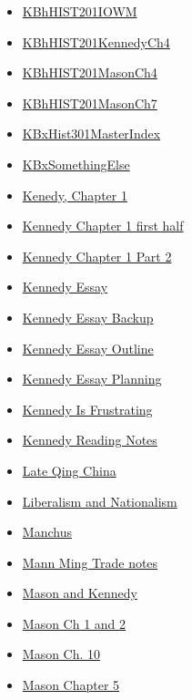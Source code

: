 \documentclass[11pt]{article}
\begin{document}
\begin{itemize}
\begin{itemize}
\begin{itemize}
\item \href{history/history10/KBhHIST201IOWM.org}{KBhHIST201IOWM}
\item \href{history/history10/KBhHIST201KennedyCh4.org}{KBhHIST201KennedyCh4}
\item \href{history/history10/KBhHIST201MasonCh4.org}{KBhHIST201MasonCh4}
\item \href{history/history10/KBhHIST201MasonCh7.org}{KBhHIST201MasonCh7}
\item \href{history/history10/KBxHist301MasterIndex.org}{KBxHist301MasterIndex}
\item \href{history/history10/KBxSomethingElse.org}{KBxSomethingElse}
\item \href{history/history10/KBhHIST201KennedyCh1.org}{Kenedy, Chapter 1}
\item \href{history/history10/KBe20hist201floKennedyCH1pt1.org}{Kennedy Chapter 1 first half}
\item \href{history/history10/retExr0nKennedyCh1Pt2.org}{Kennedy Chapter 1 Part 2}
\item \href{history/history10/KBhHIST201KennedyEssay.org}{Kennedy Essay}
\item \href{history/history10/KBhHIST201EssayBackup.org}{Kennedy Essay Backup}
\item \href{history/history10/KBdHistMAKennedyOutline.org}{Kennedy Essay Outline}
\item \href{history/history10/KBe20hist201retKennedyEssay.org}{Kennedy Essay Planning}
\item \href{history/history10/KBhHIST201KennedyIsFrustrating.org}{Kennedy Is Frustrating}
\item \href{history/history10/KBKennedyNotes.org}{Kennedy Reading Notes}
\item \href{history/history10/KBhHIST101LateQingChina.org}{Late Qing China}
\item \href{history/history10/KBhHIST201LiberalismAndNationalism.org}{Liberalism and Nationalism}
\item \href{history/history10/KBhHIST201Qing1500s.org}{Manchus}
\item \href{history/history10/retExr0nMannMingTrade.org}{Mann Ming Trade notes}
\item \href{history/history10/KBhHIST201MasonAndKennedy.org}{Mason and Kennedy}
\item \href{history/history10/KBhHIST201MasonCh1n2.org}{Mason Ch 1 and 2}
\item \href{history/history10/KBxMason10.org}{Mason Ch. 10}
\item \href{history/history10/KBhHIST201MasonCh5.org}{Mason Chapter 5}

\end{itemize}
\end{itemize}
\end{itemize}
\end{document}
